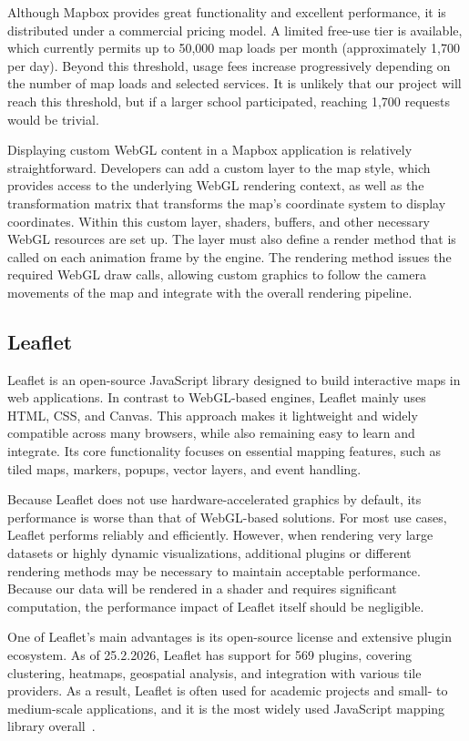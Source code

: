 Although Mapbox provides great functionality and excellent performance, it is distributed under a commercial pricing model. A limited free-use tier is available, which currently permits up to 50,000 map loads per month (approximately 1,700 per day). Beyond this threshold, usage fees increase progressively depending on the number of map loads and selected services. It is unlikely that our project will reach this threshold, but if a larger school participated, reaching 1,700 requests would be trivial.

Displaying custom WebGL content in a Mapbox application is relatively straightforward. Developers can add a custom layer to the map style, which provides access to the underlying WebGL rendering context, as well as the transformation matrix that transforms the map’s coordinate system to display coordinates. Within this custom layer, shaders, buffers, and other necessary WebGL resources are set up. The layer must also define a render method that is called on each animation frame by the engine. The rendering method issues the required WebGL draw calls, allowing custom graphics to follow the camera movements of the map and integrate with the overall rendering pipeline.

\subsection{Leaflet}

Leaflet\cite{libs:leaflet} is an open-source JavaScript library designed to build interactive maps in web applications. In contrast to WebGL-based engines, Leaflet mainly uses HTML, CSS, and Canvas. This approach makes it lightweight and widely compatible across many browsers, while also remaining easy to learn and integrate. Its core functionality focuses on essential mapping features, such as tiled maps, markers, popups, vector layers, and event handling.

Because Leaflet does not use hardware-accelerated graphics by default, its performance is worse than that of WebGL-based solutions. For most use cases, Leaflet performs reliably and efficiently. However, when rendering very large datasets or highly dynamic visualizations, additional plugins or different rendering methods may be necessary to maintain acceptable performance. Because our data will be rendered in a shader and requires significant computation, the performance impact of Leaflet itself should be negligible.

One of Leaflet’s main advantages is its open-source license and extensive plugin ecosystem. As of 25.2.2026, Leaflet has support for 569 plugins, covering clustering, heatmaps, geospatial analysis, and integration with various tile providers. As a result, Leaflet is often used for academic projects and small- to medium-scale applications, and it is the most widely used JavaScript mapping library overall~\cite{libs:leaflet_usage}.


